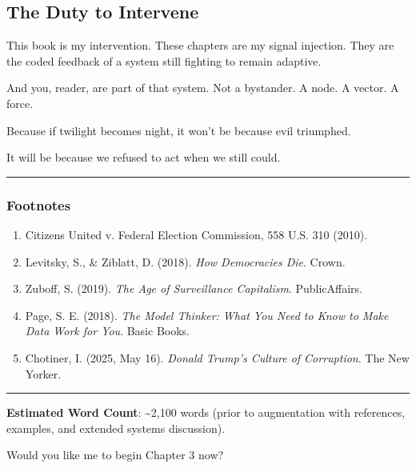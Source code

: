 \documentclass[
]{article}
\providecommand{\tightlist}{%
  \setlength{\itemsep}{0pt}\setlength{\parskip}{0pt}}
\begin{document}
\subsection{The Duty to Intervene}\label{the-duty-to-intervene}

This book is my intervention. These chapters are my signal injection. They are the coded feedback of a system still fighting to remain adaptive.

And you, reader, are part of that system. Not a bystander. A node. A vector. A force.

Because if twilight becomes night, it won't be because evil triumphed.

It will be because we refused to act when we still could.

\begin{center}\rule{0.5\linewidth}{0.5pt}\end{center}

\subsubsection{Footnotes}\label{footnotes}

\begin{enumerate}
\def\labelenumi{\arabic{enumi}.}
\tightlist
\item
  Citizens United v. Federal Election Commission, 558 U.S. 310 (2010).
\item
  Levitsky, S., \& Ziblatt, D. (2018). \emph{How Democracies Die}. Crown.
\item
  Zuboff, S. (2019). \emph{The Age of Surveillance Capitalism}. PublicAffairs.
\item
  Page, S. E. (2018). \emph{The Model Thinker: What You Need to Know to Make Data Work for You}. Basic Books.
\item
  Chotiner, I. (2025, May 16). \emph{Donald Trump's Culture of Corruption}. The New Yorker.
\end{enumerate}

\begin{center}\rule{0.5\linewidth}{0.5pt}\end{center}

\textbf{Estimated Word Count}: \textasciitilde2,100 words (prior to augmentation with references, examples, and extended systems discussion).

Would you like me to begin Chapter 3 now?
\end{document}
